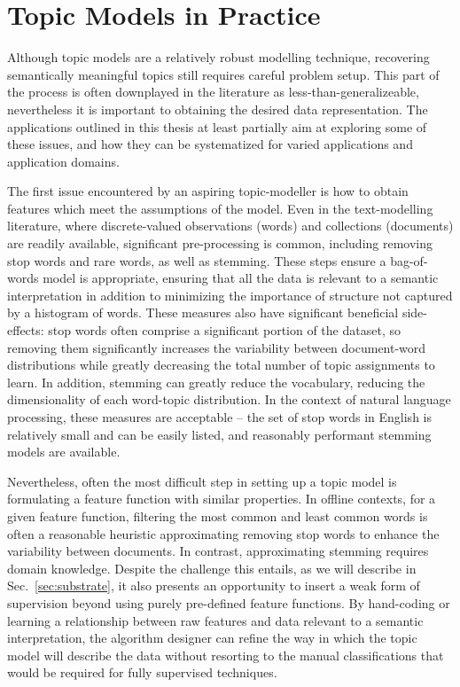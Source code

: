 \section{Topic Models in Practice} \label{sec:topic-models-inpractice}
Although topic models are a relatively robust modelling technique, recovering semantically meaningful topics still requires careful problem setup. This part of the process is often downplayed in the literature as less-than-generalizeable, nevertheless it is important to obtaining the desired data representation. The applications outlined in this thesis at least partially aim at exploring some of these issues, and how they can be systematized for varied applications and application domains.

The first issue encountered by an aspiring topic-modeller is how to obtain features which meet the assumptions of the model. Even in the text-modelling literature, where discrete-valued observations (words) and collections (documents) are readily available, significant pre-processing is common, including removing stop words and rare words, as well as stemming. These steps ensure a bag-of-words model is appropriate, ensuring that all the data is relevant to a semantic interpretation in addition to minimizing the importance of structure not captured by a histogram of words. These measures also have significant beneficial side-effects: stop words often comprise a significant portion of the dataset, so removing them significantly increases the variability between document-word distributions while greatly decreasing the total number of topic assignments to learn. In addition, stemming can greatly reduce the vocabulary, reducing the dimensionality of each word-topic distribution. In the context of natural language processing, these measures are acceptable -- the set of stop words in English is relatively small and can be easily listed, and reasonably performant stemming models are available.

Nevertheless, often the most difficult step in setting up a topic model is formulating a feature function with similar properties. In offline contexts, for a given feature function, filtering the most common and least common words is often a reasonable heuristic approximating removing stop words to enhance the variability between documents. In contrast, approximating stemming requires domain knowledge. Despite the challenge this entails, as we will describe in Sec.~\ref{sec:substrate}, it also presents an opportunity to insert a weak form of supervision beyond using purely pre-defined feature functions. By hand-coding or learning a relationship between raw features and data relevant to a semantic interpretation, the algorithm designer can refine the way in which the topic model will describe the data without resorting to the manual classifications that would be required for fully supervised techniques.

